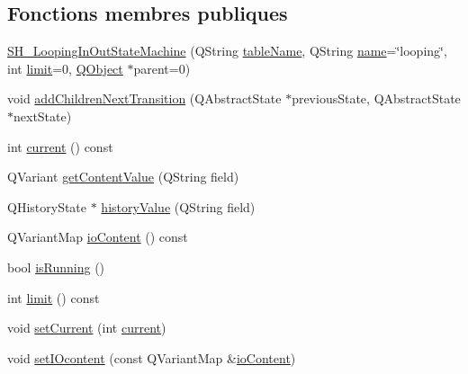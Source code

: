 \subsection*{Fonctions membres publiques}
\begin{DoxyCompactItemize}
\item 
\hyperlink{classSimpleHotel_1_1SH__LoopingInOutStateMachine_af4b22111a0eb0e14682940f6aabe477f}{S\-H\-\_\-\-Looping\-In\-Out\-State\-Machine} (Q\-String \hyperlink{classSimpleHotel_1_1SH__InOutStateMachine_a9fd170fd458e524ac0629b64d5323a45}{table\-Name}, Q\-String \hyperlink{classSimpleHotel_1_1SH__NamedObject_ad144716345034c91cface8f3163a799e}{name}=\char`\"{}looping\char`\"{}, int \hyperlink{classSimpleHotel_1_1SH__LoopingInOutStateMachine_a5039255365e39a63520818168200b686}{limit}=0, \hyperlink{classQObject}{Q\-Object} $\ast$parent=0)
\item 
void \hyperlink{classSimpleHotel_1_1SH__LoopingInOutStateMachine_a2ac2ff43d97fd1b12e1b30d6818f33e4}{add\-Children\-Next\-Transition} (Q\-Abstract\-State $\ast$previous\-State, Q\-Abstract\-State $\ast$next\-State)
\item 
int \hyperlink{classSimpleHotel_1_1SH__LoopingInOutStateMachine_a8fea676c16c02ceb82cbb8a93088634e}{current} () const 
\item 
Q\-Variant \hyperlink{classSimpleHotel_1_1SH__InOutStateMachine_a4e2afab69163c7ce53dd6a40c793d5dc}{get\-Content\-Value} (Q\-String field)
\item 
Q\-History\-State $\ast$ \hyperlink{classSimpleHotel_1_1SH__InOutStateMachine_af9de98943b9428ed4144bc6695c1ada0}{history\-Value} (Q\-String field)
\item 
Q\-Variant\-Map \hyperlink{classSimpleHotel_1_1SH__InOutStateMachine_a378618937520bc65b6e25cd187a92aad}{io\-Content} () const 
\item 
bool \hyperlink{classSimpleHotel_1_1SH__GenericStateMachine_a23d9e26143a6732fa5a8f540eb827e03}{is\-Running} ()
\item 
int \hyperlink{classSimpleHotel_1_1SH__LoopingInOutStateMachine_a8a03fc485725d7cd8150dac26f2aa617}{limit} () const 
\item 
void \hyperlink{classSimpleHotel_1_1SH__LoopingInOutStateMachine_a353f7fbee54dd8e544b32c81db0658a2}{set\-Current} (int \hyperlink{classSimpleHotel_1_1SH__LoopingInOutStateMachine_a8fea676c16c02ceb82cbb8a93088634e}{current})
\item 
void \hyperlink{classSimpleHotel_1_1SH__InOutStateMachine_a60245aa45ba2b9720965412774e123fb}{set\-I\-Ocontent} (const Q\-Variant\-Map \&\hyperlink{classSimpleHotel_1_1SH__InOutStateMachine_a378618937520bc65b6e25cd187a92aad}{io\-Content})

\end{DoxyCompactItemize}
